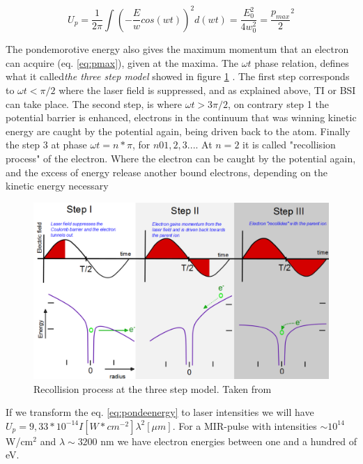 \begin{equation} 
U_{p} = \dfrac{1}{2\pi} \int (-\dfrac{E}{w} cos (wt))^{2}d(wt) = \dfrac{E^{2}_{0}}{4w^{2}_{0}} = \dfrac{p_{max}}{2}^{2}
\label{eq:pondeenergy}
\end{equation}

The pondemorotive energy also gives the maximum momentum that an electron can acquire (eq. \ref{eq:pmax}), given at the maxima. The $\omega t$ phase relation, defines what it called\textit{the three step model} showed in figure \ref{fig:ponder} . The first step corresponds to $\omega t < \pi /2$ where the laser field is suppressed, and as explained above, TI or BSI can take place. The second step, is where $\omega t > 3\pi /2$, on contrary step 1 the potential barrier is enhanced, electrons in the continuum that was winning kinetic energy are caught by the potential again, being driven  back to the atom. Finally the step 3 at phase $\omega t = n* \pi$, for $n 0 1,2,3...$. At $n=2$ it is called "recollision process" of the electron. Where the electron can be caught by the potential again, and the excess of energy release another bound electrons, depending on the kinetic energy necessary \cite{krishnan_ignition_2012}

\begin{figure}[h!]\label{fig:ponder}
\centering
\includegraphics[width=12 cm]{../Images/ponderomotive steps.png}
\caption[Ponderomotive 3 steps]{Recollision  process at the three step model. Taken from \cite{krishnan_doped_2011}}
\label{fig:ponder}
\end{figure}


If we transform the eq. \ref{eq:pondeenergy} to laser intensities we will have $U_{p} = 9,33*10^{-14} I[W*cm^{-2}] \lambda^{2}[\mu m]$. For a MIR-pulse with intensities $\sim 10^{14}$ W/cm$^{2}$ and $\lambda \sim 3200$ nm we have electron energies between one and a hundred of eV.

